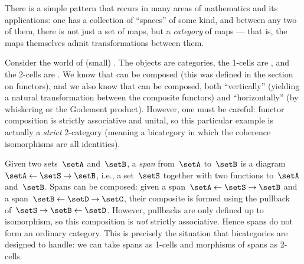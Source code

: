 There is a simple pattern that recurs in many areas of mathematics and its applications: one has a collection of ``spaces'' of some kind, and between any two of them, there is not just a set of maps, but a \emph{category} of maps --- that is, the maps themselves admit transformations between them.

\begin{example}
    \label{exa:bicat-motivation-cat}
    Consider the world of (small) .
    The objects are categories, the 1-cells are , and the 2-cells are .
    We know that  can be composed (this was defined in the section on functors), and we also know that  can be composed, both ``vertically'' (yielding a natural transformation between the composite functors) and ``horizontally'' (by whiskering or the Godement product).
    However, one must be careful: functor composition is strictly associative and unital, so this particular example is actually a \emph{strict} 2-category (meaning a bicategory in which the coherence isomorphisms are all identities).
\end{example}

\begin{example}
    \label{exa:bicat-motivation-span}
    Given two sets~$\setA$ and~$\setB$, a \emph{span} from~$\setA$ to~$\setB$ is a diagram~$\setA \leftarrow \setS \rightarrow \setB$, i.e., a set~$\setS$ together with two functions to~$\setA$ and~$\setB$.
    Spans can be composed: given a span~$\setA \leftarrow \setS \rightarrow \setB$ and a span~$\setB \leftarrow \setD \rightarrow \setC$, their composite is formed using the pullback of~$\setS \rightarrow \setB \leftarrow \setD$.
    However, pullbacks are only defined up to isomorphism, so this composition is \emph{not} strictly associative.
    Hence spans do not form an ordinary category.
    This is precisely the situation that bicategories are designed to handle: we can take spans as 1-cells and morphisms of spans as 2-cells.
\end{example}

